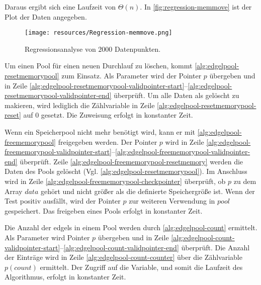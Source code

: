 Daraus ergibt sich eine Laufzeit von $\Theta(n)$. In \autoref{fig:regression-memmove} ist der Plot der Daten angegeben.

\begin{figure}[!ht]
	\centering
	\texttt{[image: resources/Regression-memmove.png]}
	\caption{Regressionsanalyse von $2000$ Datenpunkten.}
	\label{fig:regression-memmove}
\end{figure}

Um einen Pool für einen neuen Durchlauf zu löschen, kommt \autoref{alg:edgelpool-resetmemorypool} zum Einsatz. Als
 Parameter wird der Pointer $p$ übergeben und in Zeile
 \ref{alg:edgelpool-resetmemorypool-validpointer-start}--\ref{alg:edgelpool-resetmemorypool-validpointer-end}
 überprüft. Um alle Daten als gelöscht zu makieren, wird lediglich die Zählvariable in Zeile
 \ref{alg:edgelpool-resetmemorypool-reset} auf $0$ gesetzt. Die Zuweisung erfolgt in konstanter Zeit.



Wenn ein Speicherpool nicht mehr benötigt wird, kann er mit \autoref{alg:edgelpool-freememorypool} freigegeben werden.
 Der Pointer $p$ wird in Zeile
 \ref{alg:edgelpool-freememorypool-validpointer-start}--\ref{alg:edgelpool-freememorypool-validpointer-end} überprüft.
 Zeile \ref{alg:edgelpool-freememorypool-resetmemory} werden die Daten des Pools gelöscht
 (Vgl. \autoref{alg:edgelpool-resetmemorypool}). Im Anschluss wird in Zeile
 \ref{alg:edgelpool-freememorypool-checkpointer} überprüft, ob $p$ zu dem Array $\mathit{data}$ gehört und nicht größer
 als die definierte Speichergröße ist. Wenn der Test positiv ausfällt, wird der Pointer $p$ zur weiteren Verwendung in
 $\mathit{pool}$ gespeichert. Das freigeben eines Pools erfolgt in konstanter Zeit.



Die Anzahl der \gls{edgels} in einem Pool werden durch \autoref{alg:edgelpool-count} ermittelt. Als Parameter wird
 Pointer $p$ übergeben und in Zeile
 \ref{alg:edgelpool-count-validpointer-start}--\ref{alg:edgelpool-count-validpointer-end} überprüft. Die Anzahl der
 Einträge wird in Zeile \ref{alg:edgelpool-count-counter} über die Zählvariable $p(\mathit{count})$ ermittelt. Der
 Zugriff auf die Variable, und somit die Laufzeit des Algorithmus, erfolgt in konstanter Zeit.










